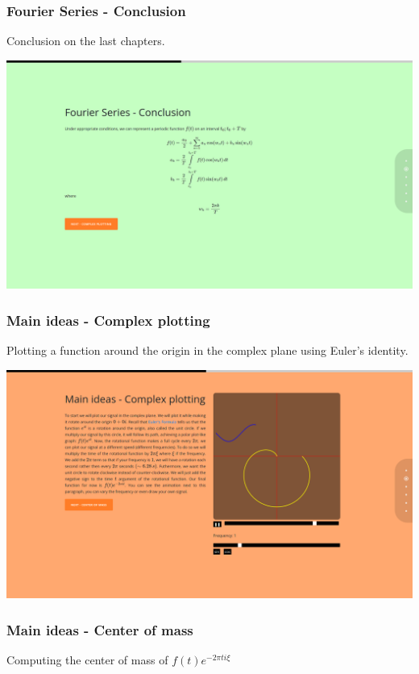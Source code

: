 \documentclass{article}
\begin{document}
\subsubsection{Fourier Series - Conclusion}

Conclusion on the last chapters.

\includegraphics[width=\textwidth]{chap8.png}

\subsubsection{Main ideas - Complex plotting}

Plotting a function around the origin in the complex plane using Euler's identity.

\includegraphics[width=\textwidth]{chap9.png}

\subsubsection{Main ideas - Center of mass}

Computing the center of mass of \(f(t)e^{-2\pi ti\xi}\)
\end{document}
